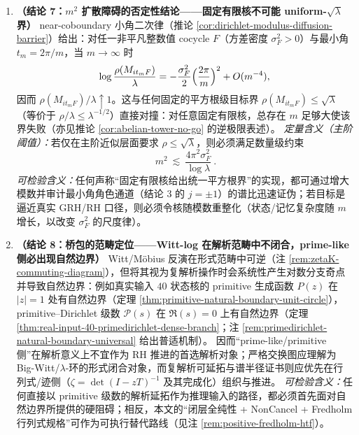 \begin{enumerate}
  \item \textbf{（结论 7：\texorpdfstring{$m^2$}{m^2} 扩散障碍的否定性结论——固定有限核不可能 uniform-\texorpdfstring{$\sqrt{\lambda}$}{sqrt(lambda)} 界）}
  near-coboundary 小角二次律（推论 \ref{cor:dirichlet-modulus-diffusion-barrier}）给出：对任一非平凡整数值 cocycle \(F\)（方差密度 \(\sigma_F^2>0\)）与最小角 \(t_m=2\pi/m\)，当 \(m\to\infty\) 时
  \[
  \log\frac{\rho(M_{it_mF})}{\lambda}
  =-\frac{\sigma_F^2}{2}\Bigl(\frac{2\pi}{m}\Bigr)^2+O(m^{-4}),
  \]
  因而 \(\rho(M_{it_mF})/\lambda\uparrow 1\)。这与任何固定的平方根级目标界
  \(
  \rho(M_{it_mF})\le \sqrt{\lambda}
  \)
  （等价于 \(\rho/\lambda\le \lambda^{-1/2}\)）直接对撞：对任意固定有限核，总存在 \(m\) 足够大使该界失败（亦见推论 \ref{cor:abelian-tower-no-go} 的逆极限表述）。
  \emph{定量含义（主阶阈值）：}若仅在主阶近似层面要求 \(\rho\le\sqrt{\lambda}\)，则必须满足数量级约束
  \[
  \boxed{\ m^2\ \lesssim\ \frac{4\pi^2\sigma_F^2}{\log\lambda}\ }.
  \]
  \emph{可检验含义：}任何声称“固定有限核给出统一平方根界”的实现，都可通过增大模数并审计最小角角色通道（结论 3 的 \(j=\pm 1\)）的谱比迅速证伪；若目标是逼近真实 GRH/RH 口径，则必须令核随模数重整化（状态/记忆复杂度随 \(m\) 增长，以改变 \(\sigma_F^2\) 的尺度律）。

  \item \textbf{（结论 8：桥包的范畴定位——Witt-log 在解析范畴中不闭合，prime-like 侧必出现自然边界）}
  Witt/Möbius 反演在形式范畴中可逆（注 \ref{rem:zetaK-commuting-diagram}），但将其视为复解析操作时会系统性产生对数分支奇点并导致自然边界：例如真实输入 \(40\) 状态核的 primitive 生成函数 \(P(z)\) 在 \(|z|=1\) 处有自然边界（定理 \ref{thm:primitive-natural-boundary-unit-circle}），primitive--Dirichlet 级数 \(\mathcal{P}(s)\) 在 \(\Re(s)=0\) 上有自然边界（定理 \ref{thm:real-input-40-primedirichlet-dense-branch}；注 \ref{rem:primedirichlet-natural-boundary-universal} 给出普适机制）。
  因而“prime-like/primitive 侧”在解析意义上不宜作为 RH 推进的首选解析对象；严格交换图应理解为 Big-Witt/\(\lambda\)-环的形式闭合对象，而复解析可延拓与谱半径证书则应优先在行列式/迹侧（\(\zeta=\det(I-zT)^{-1}\) 及其完成化）组织与推进。
  \emph{可检验含义：}任何直接以 primitive 级数的解析延拓作为推理输入的路径，都必须首先面对自然边界所提供的硬阻碍；相反，本文的“闭层全纯性 + NonCancel + Fredholm 行列式规格”可作为可执行替代路线（见注 \ref{rem:positive-fredholm-htf}）。


\end{enumerate}
